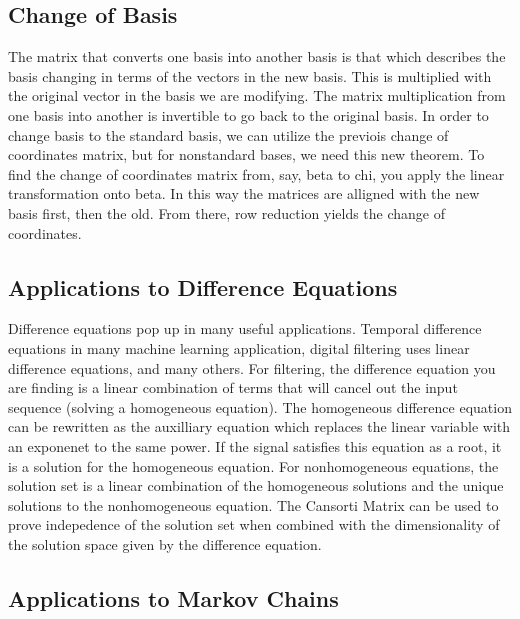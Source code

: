 \documentclass[12pt]{article}
\begin{document}
 \subsection{Change of Basis}
 The matrix that converts one basis into another basis is that which describes the basis changing in terms of the vectors in the new basis. 
 This is multiplied with the original vector in the basis we are modifying. The matrix multiplication from one basis into another
 is invertible to go back to the original basis. In order to change basis to the standard basis, we can utilize the previois change of 
 coordinates matrix, but for nonstandard bases, we need this new theorem. To find the change of coordinates matrix from, say, beta to chi, 
 you apply the linear transformation onto beta. In this way the matrices are alligned with the new basis first, then the old. From there, 
 row reduction yields the change of coordinates. 
 \subsection{Applications to Difference Equations}
 Difference equations pop up in many useful applications. Temporal difference equations in many machine learning application, digital 
 filtering uses linear difference equations, and many others. For filtering, the difference equation you are finding is a linear combination
 of terms that will cancel out the input sequence (solving a homogeneous equation). The homogeneous difference equation can be rewritten as the 
 auxilliary equation which replaces the linear variable with an exponenet to the same power. If the signal satisfies this equation as a root, it 
 is a solution for the homogeneous equation. For nonhomogeneous equations, the solution set is a linear combination of the homogeneous solutions
 and the unique solutions to the nonhomogeneous equation. The Cansorti Matrix can be used to prove indepedence of the solution set when 
 combined with the dimensionality of the solution space given by the difference equation.
 \subsection{Applications to Markov Chains}
 
    
\end{document}
